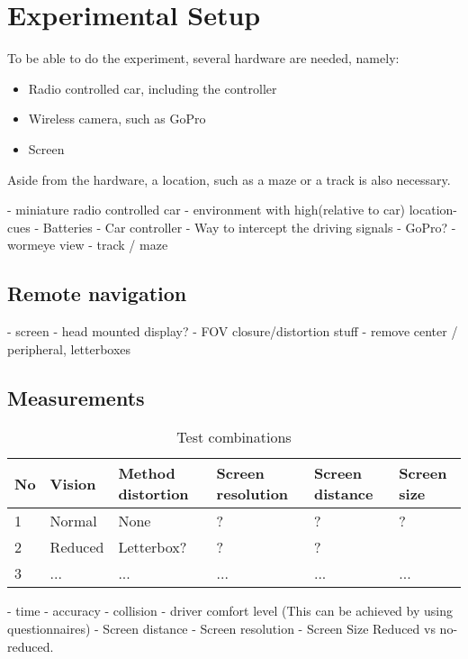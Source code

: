 \chapter{Experimental Setup}
To be able to do the experiment, several hardware are needed, namely:

\begin{itemize}
  \item Radio controlled car, including the controller
  \item Wireless camera, such as GoPro
  \item Screen
\end{itemize}

Aside from the hardware, a location, such as a maze or a track is also necessary. 

- miniature radio controlled car
- environment with high(relative to car) location-cues
- Batteries
- Car controller
- Way to intercept the driving signals
- GoPro?
- wormeye view
- track / maze

\section{Remote navigation}
- screen
- head mounted display?
- FOV closure/distortion stuff
- remove center / peripheral, letterboxes


\section{Measurements}
\begin{table}[h]
\begin{tabular}{|l|lllll|}
\hline
No & Vision  & Method distortion & Screen resolution & Screen distance & Screen size \\\hline
1  & Normal  & None              & ?                 & ?               & ?           \\
2  & Reduced & Letterbox?        & ?                 & ?               &             \\
3  & ...     & ...               & ...               & ...             & ...        \\\hline
\end{tabular}
\caption{Test combinations}
\end{table}

- time
- accuracy
- collision
- driver comfort level (This can be achieved by using questionnaires)
- Screen distance
- Screen resolution
- Screen Size
Reduced vs no-reduced.